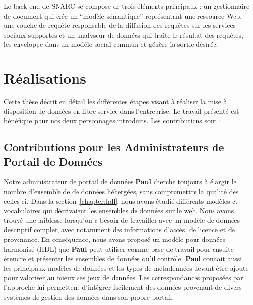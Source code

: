 Le back-end de SNARC se compose de trois \'{e}l\'{e}ments principaux : un gestionnaire de document qui cr\'{e}e un ``mod\`{e}le s\'{e}mantique'' repr\'{e}sentant une ressource Web, une couche de requête responsable de la diffusion des requêtes sur les services sociaux supportes et un analyseur de donn\'{e}es qui traite le r\'{e}sultat des requêtes, les enveloppe dans un mod\`{e}le social commun et g\'{e}n\`{e}re la sortie d\'{e}sir\'{e}e.


\section{R\'{e}alisations}

Cette th\`{e}se d\'{e}crit en d\'{e}tail les diff\'{e}rentes \'{e}tapes visant à r\'{e}aliser la mise à disposition de donn\'{e}es en libre-service dans l'entreprise. Le travail pr\'{e}sent\'{e} est b\'{e}n\'{e}fique pour nos deux personnages introduits. Les contributions sont : \\

\subsection{Contributions pour les Administrateurs de Portail de Donn\'{e}es}

Notre administrateur de portail de donn\'{e}es \textbf{Paul} cherche toujours à \'{e}largir le nombre d'ensemble de de donn\'{e}es h\'{e}berg\'{e}es, sans compromettre la qualit\'{e} des celles-ci. Dans la section~\ref{chapter:hdl}, nous avons \'{e}tudi\'{e} diff\'{e}rents mod\`{e}les et vocabulaires qui d\'{e}crivaient les ensembles de donn\'{e}es sur le web. Nous avons trouv\'{e} une faiblesse lorsqu'on a besoin de travailler avec un mod\`{e}le de donn\'{e}es descriptif complet, avec notamment des informations d'acc\`{e}s, de licence et de provenance. En cons\'{e}quence, nous avons propos\'{e} un mod\`{e}le pour donn\'{e}es harmonis\'{e} (HDL) que \textbf{Paul} peut utiliser comme base de travail pour ensuite \'{e}tendre et pr\'{e}senter les ensembles de donn\'{e}es qu'il contrôle. \textbf{Paul} connait aussi les principaux mod\`{e}les de donn\'{e}es et les types de m\'{e}tadonn\'{e}es devant être ajoute pour valoriser au mieux ses jeux de donn\'{e}es. Les correspondances propos\'{e}es par l'approche lui permettent d'int\'{e}grer facilement des donn\'{e}es provenant de divers syst\`{e}mes de gestion des donn\'{e}es dans son propre portail.

